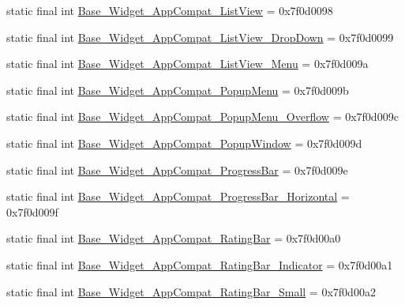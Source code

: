 \begin{DoxyCompactItemize}
\item 
static final int \mbox{\hyperlink{classandroid_1_1support_1_1v7_1_1appcompat_1_1R_1_1style_aa10a4813e78697cb0b6a93321b659876}{Base\+\_\+\+Widget\+\_\+\+App\+Compat\+\_\+\+List\+View}} = 0x7f0d0098
\item 
static final int \mbox{\hyperlink{classandroid_1_1support_1_1v7_1_1appcompat_1_1R_1_1style_a03f9bb002e1b5558f1c636204e2c8e67}{Base\+\_\+\+Widget\+\_\+\+App\+Compat\+\_\+\+List\+View\+\_\+\+Drop\+Down}} = 0x7f0d0099
\item 
static final int \mbox{\hyperlink{classandroid_1_1support_1_1v7_1_1appcompat_1_1R_1_1style_a7cdf63459830b3d4f230ec698e252e41}{Base\+\_\+\+Widget\+\_\+\+App\+Compat\+\_\+\+List\+View\+\_\+\+Menu}} = 0x7f0d009a
\item 
static final int \mbox{\hyperlink{classandroid_1_1support_1_1v7_1_1appcompat_1_1R_1_1style_aeb2e167384b173a5b7eccad9e709dc4d}{Base\+\_\+\+Widget\+\_\+\+App\+Compat\+\_\+\+Popup\+Menu}} = 0x7f0d009b
\item 
static final int \mbox{\hyperlink{classandroid_1_1support_1_1v7_1_1appcompat_1_1R_1_1style_a622b3b8e1b4687c1bb1aed07dd86ba93}{Base\+\_\+\+Widget\+\_\+\+App\+Compat\+\_\+\+Popup\+Menu\+\_\+\+Overflow}} = 0x7f0d009c
\item 
static final int \mbox{\hyperlink{classandroid_1_1support_1_1v7_1_1appcompat_1_1R_1_1style_a9d581659ad76c3760d146bf65a6c2166}{Base\+\_\+\+Widget\+\_\+\+App\+Compat\+\_\+\+Popup\+Window}} = 0x7f0d009d
\item 
static final int \mbox{\hyperlink{classandroid_1_1support_1_1v7_1_1appcompat_1_1R_1_1style_a23ddcd82dd90ff3db0cfbb294ced55aa}{Base\+\_\+\+Widget\+\_\+\+App\+Compat\+\_\+\+Progress\+Bar}} = 0x7f0d009e
\item 
static final int \mbox{\hyperlink{classandroid_1_1support_1_1v7_1_1appcompat_1_1R_1_1style_ae7a6f152b019b8c804fe7dd65f1a55ed}{Base\+\_\+\+Widget\+\_\+\+App\+Compat\+\_\+\+Progress\+Bar\+\_\+\+Horizontal}} = 0x7f0d009f
\item 
static final int \mbox{\hyperlink{classandroid_1_1support_1_1v7_1_1appcompat_1_1R_1_1style_aabdc53483e923ebf2f75d30416e7884e}{Base\+\_\+\+Widget\+\_\+\+App\+Compat\+\_\+\+Rating\+Bar}} = 0x7f0d00a0
\item 
static final int \mbox{\hyperlink{classandroid_1_1support_1_1v7_1_1appcompat_1_1R_1_1style_a74a5b00b4fe82504eddaa0878577e3c5}{Base\+\_\+\+Widget\+\_\+\+App\+Compat\+\_\+\+Rating\+Bar\+\_\+\+Indicator}} = 0x7f0d00a1
\item 
static final int \mbox{\hyperlink{classandroid_1_1support_1_1v7_1_1appcompat_1_1R_1_1style_aa145c0142507a97d6a17c35a48449292}{Base\+\_\+\+Widget\+\_\+\+App\+Compat\+\_\+\+Rating\+Bar\+\_\+\+Small}} = 0x7f0d00a2

\end{DoxyCompactItemize}
